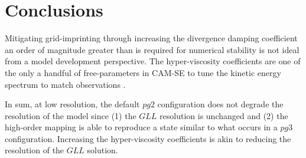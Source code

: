 \documentclass{agujournal}
\begin{document}

\section{Conclusions}\label{sec:conclusions}

Mitigating grid-imprinting through increasing the divergence damping coefficient an order of magnitude greater than is required for numerical stability is not ideal from a model development perspective. The hyper-viscosity coefficients are one of the only a handful of free-parameters in CAM-SE to tune the kinetic energy spectrum to match observations \citep{SPKS2014JAS,LetAl2018JAMES}. 

In sum, at low resolution, the default $pg2$ configuration does not degrade the resolution of the model since (1) the $GLL$ resolution is unchanged and (2) the high-order mapping is able to reproduce a state similar to what occurs in a $pg3$ configuration. Increasing the hyper-viscosity coefficients is akin to reducing the resolution of the $GLL$ solution.


\end{document}
